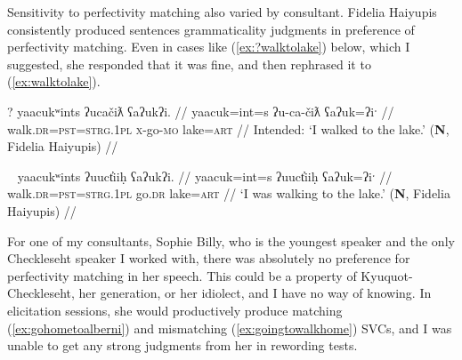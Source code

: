 \begin{comment}
(\ref{ex:drivehome}) and (\ref{ex:*drivehome}) show the same pattern and were elicited in the same way	. In (\ref{ex:drivehome}), the first verb \textit{ƛiḥaa} is in the continuative aspect, which is imperfective, and the second verb \textit{waałšiƛ} is in graduative, which is also imperfective. In (\ref{ex:*drivehome}), the same two verb roots are used, but instead of imperfective, graduative \textit{waałšiƛ}, there is momentaneous, perfective \textit{wałšiƛ}. This aspectual mismatch causes (\ref{ex:*drivehome}) to be ungrammatical.

\ex \label{ex:drivehome}
\begingl
\glpreamble ƛiḥaamitniš siy̓a łuučm̓uupukqs waałšiƛ. //
\gla ƛiḥ-(y)aˑ=(m)it=niˑš siy̓a łuučm̓uup=uk=qs wał-šiƛ-LS //
\glb drive-\textsc{cv}=\textsc{pst}=\textsc{strg.1pl} \textsc{1sg} sister=\textsc{poss}=\textsc{defn.1sg} go.home-\textsc{mo}-\textsc{gr} //
\glft `We were driving home in the car.' (\textbf{C}, \textit{tupaat} Julia Lucas) //
\endgl
\xe

\ex~ \label{ex:*drivehome}
\begingl
\glpreamble *wałšiƛw̓it̓asniš ƛiḥaa. //
\gla wał-šiƛ-w̓it̓as=niˑš ƛiḥ-(y)aˑ //
\glb go.home-\textsc{mo}-going.to=\textsc{strg.1pl} drive-\textsc{cv} //
\glft Intended: `We will drive home.' (\textbf{C}, \textit{tupaat} Julia Lucas) //
\endgl
\xe
\end{comment}

Sensitivity to perfectivity matching also varied by consultant. Fidelia Haiyupis consistently produced sentences grammaticality judgments in preference of perfectivity matching. Even in cases like (\ref{ex:?walktolake}) below, which I suggested, she responded that it was fine, and then rephrased it to (\ref{ex:walktolake}).

\ex \label{ex:?walktolake}
\begingl
\glpreamble ? yaacukʷints ʔucačiƛ ʕaʔukʔi. //
\gla yaacuk=int=s ʔu-ca-čiƛ ʕaʔuk=ʔiˑ //
\glb walk.\textsc{dr}=\textsc{pst}=\textsc{strg.1pl} \textsc{x}-go-\textsc{mo} lake=\textsc{art} //
\glft Intended: `I walked to the lake.' (\textbf{N}, Fidelia Haiyupis) //
\endgl
\xe

\ex~ \label{ex:walktolake}
\begingl
\glpreamble yaacukʷints ʔuuct̓iiḥ ʕaʔukʔi. //
\gla yaacuk=int=s ʔuuct̓iiḥ ʕaʔuk=ʔiˑ //
\glb walk.\textsc{dr}=\textsc{pst}=\textsc{strg.1pl} go.\textsc{dr} lake=\textsc{art} //
\glft `I was walking to the lake.' (\textbf{N}, Fidelia Haiyupis) //
\endgl
\xe

For one of my consultants, Sophie Billy, who is the youngest speaker and the only Checkleseht speaker I worked with, there was absolutely no preference for perfectivity matching in her speech. This could be a property of Kyuquot-Checkleseht, her generation, or her idiolect, and I have no way of knowing. In elicitation sessions, she would productively produce matching (\ref{ex:gohometoalberni}) and mismatching (\ref{ex:goingtowalkhome}) SVCs, and I was unable to get any strong judgments from her in rewording tests.

